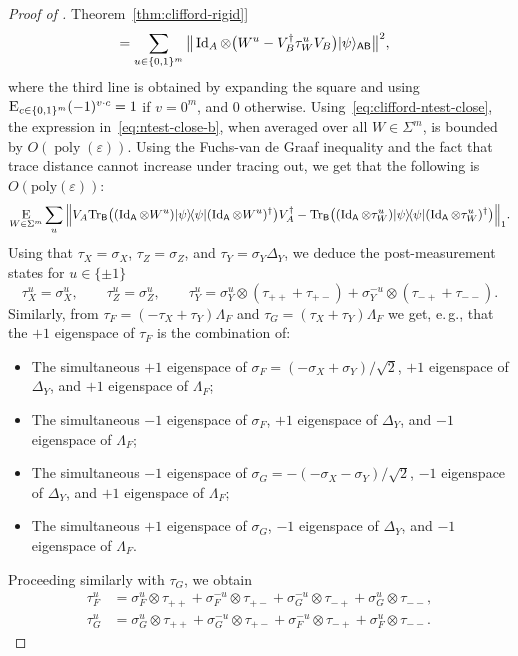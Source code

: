 \documentclass[11pt]{article}
\numberwithin{equation}{section}
\theoremstyle{definition}
\theoremstyle{plain}
\newcommand{\eg}{e.\,g.}
\newcommand{\expref}[2]{\hyperref[#2]{#1~\ref{#2}}}
\newcommand{\ket}[1]{|#1\rangle}
\newcommand{\bra}[1]{\langle#1|}
\newcommand{\proj}[1]{\ket{#1}\!\bra{#1}}
\newcommand{\Tr}{\mbox{\rm Tr}}
\newcommand{\Id}{\ensuremath{\mathop{\rm Id}\nolimits}}
\newcommand{\Es}[1]{\ensuremath{\mathop{\textsc{E}}}_{#1}} %
\DeclareMathOperator{\poly}{poly}
\newcommand{\reg}[1]{{\textsf{#1}}}
\newcommand{\eps}{\varepsilon}
\newcommand{\phase}{\Lambda}
\begin{document}
\begin{proof}[Proof of \expref{Theorem}{thm:clifford-rigid}]
\begin{align}
&= \sum_{u\in\{0,1\}^m}\big\|  \Id_A \otimes \big(  W^{u} - V_B^\dagger\tau_{W}^{u} V_B\big)   \ket{\psi}_{\reg{AB}} \big\|^2, \label{eq:ntest-close-b}  
\end{align}
where the third line is obtained by expanding the square and using
  $\Es{c\in\{0,1\}^m} (-1)^{v \cdot c} = 1$ if $v=0^m$, and $0$ otherwise. Using~\eqref{eq:clifford-ntest-close}, the expression in~\eqref{eq:ntest-close-b}, when averaged over all $W\in\Sigma^{ m}$, is bounded by $O(\poly(\eps))$. Using the Fuchs-van de Graaf inequality and the fact that trace distance cannot increase under tracing out, we get that the following is $O(\mathrm{poly}(\eps))$:
\begin{equation}\label{eq:ntest-close-c}
\Es{W\in\Sigma^{m}}\sum_{u} \Big\| V_A\Tr_\reg{B}\big( (\Id_\reg{A} \otimes W^{u})\proj{\psi}(\Id_\reg{A} \otimes W^{u})^\dagger \big) V_A^\dagger- \Tr_\reg{B}\big( (\Id_\reg{A} \otimes \tau_W^{u})\proj{\psi}(\Id_\reg{A} \otimes \tau_W^{u})^\dagger \big) \Big\|_1. \end{equation}
Using that $\tau_X = \sigma_X$, $\tau_Z = \sigma_Z$, and $\tau_Y = \sigma_Y \Delta_Y$, we deduce the post-measurement states for $u\in\{\pm 1\}$
$$ \tau_X^u = \sigma_X^u, \qquad \tau_Z^u = \sigma_Z^u,\qquad \tau_Y^u = \sigma_{Y}^u \otimes (\tau_{++}+\tau_{+-}) + \sigma_{Y}^{-u} \otimes (\tau_{-+}+\tau_{--}).$$ 
Similarly, from $\tau_F = (-\tau_X + \tau_Y)\phase_F$ and $\tau_G = (\tau_X + \tau_Y)\phase_F$ we %
get, \eg, that   %
the $+1$ eigenspace of $\tau_F$ is the combination of:
\begin{itemize}[nolistsep]
\item The simultaneous $+1$ eigenspace of $\sigma_F = (-\sigma_X+\sigma_Y)/\sqrt{2}$, $+1$ eigenspace of $\Delta_Y$, and $+1$ eigenspace of $\phase_F$;
\item The simultaneous $-1$ eigenspace of $\sigma_F$, $+1$ eigenspace of $\Delta_Y$, and $-1$ eigenspace of $\phase_F$;
\item The simultaneous $-1$ eigenspace of $\sigma_G = -(-\sigma_X-\sigma_Y)/\sqrt{2}$, $-1$ eigenspace of $\Delta_Y$, and $+1$ eigenspace of $\phase_F$;
\item The simultaneous $+1$ eigenspace of $\sigma_G$, $-1$ eigenspace of $\Delta_Y$, and $-1$ eigenspace of $\phase_F$.
\end{itemize}

Proceeding similarly with $\tau_G$, we obtain 
\begin{align*}
 \tau_F^u &= \sigma_F^u \otimes \tau_{++} + \sigma_F^{-u} \otimes \tau_{+-} + \sigma_G^{-u} \otimes \tau_{-+} + \sigma_G^u \otimes \tau_{--},\\
 \tau_G^u &= \sigma_G^u \otimes \tau_{++} + \sigma_G^{-u} \otimes \tau_{+-} + \sigma_F^{-u} \otimes \tau_{-+} + \sigma_F^u \otimes \tau_{--}.
\end{align*}


\end{proof}
\end{document}

